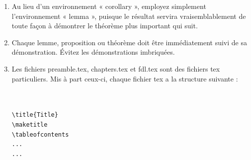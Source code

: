 \begin{enumerate}
\item Au lieu d'un environnement « corollary », employez simplement
l'environnement « lemma », puisque le résultat servira vraisemblablement de
toute façon à démontrer le théorème plus important qui suit.
\item Chaque lemme, proposition ou théorème doit être immédiatement suivi de
sa démonstration. Évitez les démonstrations imbriquées.
\item Les fichiers preamble.tex, chapters.tex et fdl.tex sont des fichiers tex
particuliers. Mis à part ceux-ci, chaque fichier tex a la structure suivante :
\begin{verbatim}


\title{Title}
\maketitle
\tableofcontents
...
...





\end{verbatim}
\end{enumerate}
